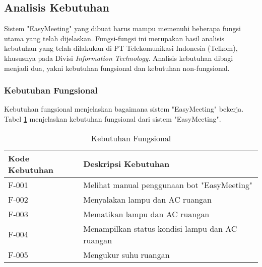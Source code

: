 \subsection{Analisis Kebutuhan}
\tab Sistem "EasyMeeting" yang dibuat harus mampu memenuhi beberapa fungsi utama yang telah dijelaskan. Fungsi-fungsi ini merupakan hasil analisis kebutuhan yang telah dilakukan di PT Telekomunikasi Indonesia (Telkom), khususnya pada Divisi \textit{Information Technology}. Analisis kebutuhan dibagi menjadi dua, yakni kebutuhan fungsional dan kebutuhan non-fungsional.

\subsubsection{Kebutuhan Fungsional}
\tab Kebutuhan fungsional menjelaskan bagaimana sistem "EasyMeeting" bekerja. Tabel \ref{tab:kebutuhan_fungsional} menjelaskan kebutuhan fungsional dari sistem "EasyMeeting".

\begin{table}[H]
	\centering
	\begin{tabular}{ | p{3cm} | p{6cm} | }
		\hline
		\textbf{Kode Kebutuhan} & \textbf{Deskripsi Kebutuhan} \\ \hline
		F-001 & Melihat manual penggunaan bot "EasyMeeting" \\ \hline
		F-002 & Menyalakan lampu dan AC ruangan \\ \hline
		F-003 & Mematikan lampu dan AC ruangan \\ \hline
		F-004 & Menampilkan status kondisi lampu dan AC ruangan \\ \hline
		F-005 & Mengukur suhu ruangan \\ \hline
	\end{tabular} \caption{Kebutuhan Fungsional}
	\label{tab:kebutuhan_fungsional}
\end{table}

